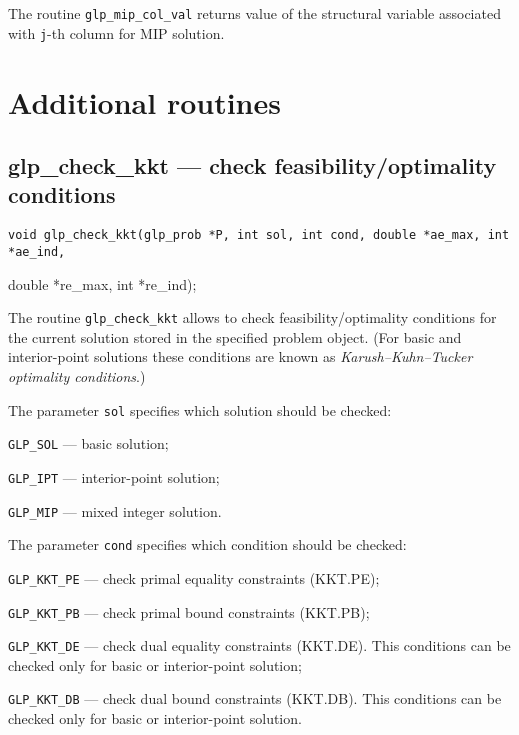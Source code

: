 \returns

The routine \verb|glp_mip_col_val| returns value of the structural
variable associated with \verb|j|-th column for MIP solution.


\newpage

\section{Additional routines}

\subsection{glp\_check\_kkt --- check feasibility/optimality
conditions}

\synopsis

{\parskip=0pt
\tt void glp\_check\_kkt(glp\_prob *P, int sol, int cond,
double *ae\_max, int *ae\_ind,

\hspace{105pt}double *re\_max, int *re\_ind);}

\description

The routine \verb|glp_check_kkt| allows to check
feasibility/optimality conditions for the current solution stored in
the specified problem object. (For basic and interior-point solutions
these conditions are known as {\it Karush--Kuhn--Tucker optimality
conditions}.)

The parameter \verb|sol| specifies which solution should be checked:

\verb|GLP_SOL| --- basic solution;

\verb|GLP_IPT| --- interior-point solution;

\verb|GLP_MIP| --- mixed integer solution.

The parameter \verb|cond| specifies which condition should be checked:

\verb|GLP_KKT_PE| --- check primal equality constraints (KKT.PE);

\verb|GLP_KKT_PB| --- check primal bound constraints (KKT.PB);

\verb|GLP_KKT_DE| --- check dual equality constraints (KKT.DE). This
conditions can be checked only for basic or interior-point solution;

\verb|GLP_KKT_DB| --- check dual bound constraints (KKT.DB). This
conditions can be checked only for basic or interior-point solution.

